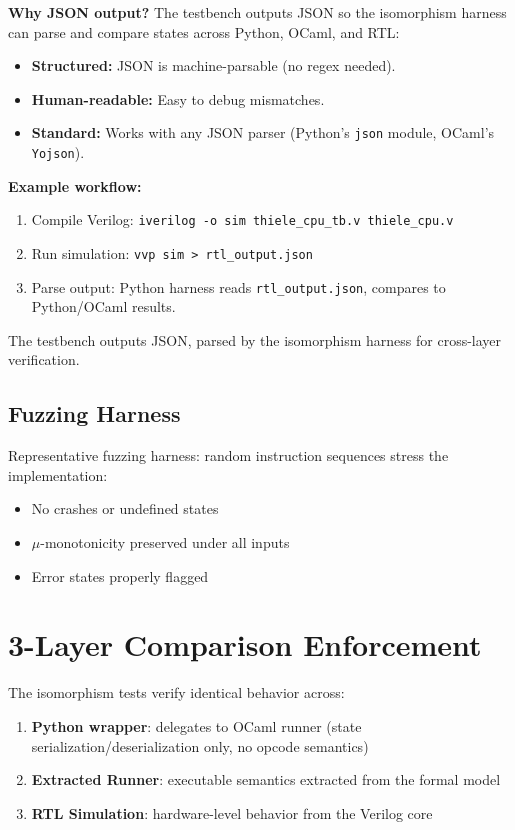 \textbf{Why JSON output?} The testbench outputs JSON so the isomorphism harness can parse and compare states across Python, OCaml, and RTL:
\begin{itemize}
    \item \textbf{Structured:} JSON is machine-parsable (no regex needed).
    \item \textbf{Human-readable:} Easy to debug mismatches.
    \item \textbf{Standard:} Works with any JSON parser (Python's \texttt{json} module, OCaml's \texttt{Yojson}).
\end{itemize}

\textbf{Example workflow:}
\begin{enumerate}
    \item Compile Verilog: \texttt{iverilog -o sim thiele\_cpu\_tb.v thiele\_cpu.v}
    \item Run simulation: \texttt{vvp sim > rtl\_output.json}
    \item Parse output: Python harness reads \texttt{rtl\_output.json}, compares to Python/OCaml results.
\end{enumerate}


The testbench outputs JSON, parsed by the isomorphism harness for cross-layer verification.

\subsection{Fuzzing Harness}

Representative fuzzing harness: random instruction sequences stress the implementation:
\begin{itemize}
    \item No crashes or undefined states
    \item $\mu$-monotonicity preserved under all inputs
    \item Error states properly flagged
\end{itemize}

\section{3-Layer Comparison Enforcement}


The isomorphism tests verify identical behavior across:
\begin{enumerate}
    \item \textbf{Python wrapper}: delegates to OCaml runner (state serialization/deserialization only, no opcode semantics)
    \item \textbf{Extracted Runner}: executable semantics extracted from the formal model
    \item \textbf{RTL Simulation}: hardware-level behavior from the Verilog core
\end{enumerate}

